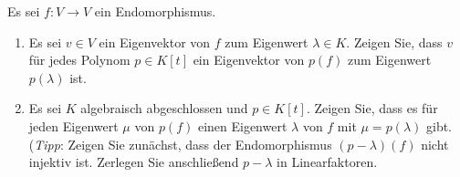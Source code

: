 \documentclass[a4paper, 10pt]{scrartcl}
\begin{document}
\begin{question}
  Es sei $f \colon V \to V$ ein Endomorphismus.
  \begin{enumerate}
    \item
      Es sei $v \in V$ ein Eigenvektor von $f$ zum Eigenwert $\lambda \in K$.
      Zeigen Sie, dass $v$ für jedes Polynom $p \in K[t]$ ein Eigenvektor von $p(f)$ zum Eigenwert $p(\lambda)$ ist.
    \item
      Es sei $K$ algebraisch abgeschlossen und $p \in K[t]$.
      Zeigen Sie, dass es für jeden Eigenwert $\mu$ von $p(f)$ einen Eigenwert $\lambda$ von $f$ mit $\mu = p(\lambda)$ gibt.
      \\
      (\emph{Tipp}:
       Zeigen Sie zunächst, dass der Endomorphismus $(p - \lambda)(f)$ nicht injektiv ist.
       Zerlegen Sie anschließend $p - \lambda$ in Linearfaktoren.
  \end{enumerate}
\end{question}
\end{document}
